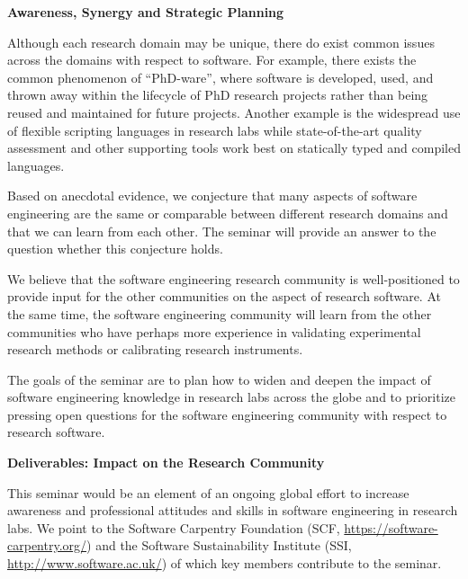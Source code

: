 \documentclass[a4paper,UKenglish]{dagman}
\renewcommand{\paragraph}[1]{{\bf #1}\xspace}
\begin{document}
\paragraph{Awareness, Synergy and Strategic Planning}

Although each research domain may be unique, there do exist common issues across the domains with respect to software. For example, there exists the common phenomenon of ``PhD-ware'', where software is developed, used, and thrown away within the lifecycle of PhD research projects rather than being reused and maintained for future projects. Another example is the widespread use of flexible scripting languages in research labs while state-of-the-art quality assessment and other supporting tools work best on statically typed and compiled languages.

Based on anecdotal evidence, we conjecture that many aspects of software engineering are the same or comparable between different research domains and that we can learn from each other. The seminar will provide an answer to the question whether this conjecture holds.

We believe that the software engineering research community is well-positioned to provide input for the other communities on the aspect of research software. At the same time, the software engineering community will learn from the other communities who have perhaps more experience in validating experimental research methods or calibrating research instruments. 

The goals of the seminar are to plan how to widen and deepen the impact of software engineering knowledge in research labs across the globe and to prioritize pressing open questions for the software engineering community with respect to research software.

\paragraph{Deliverables: Impact on the Research Community}

This seminar would be an element of an ongoing global effort to increase awareness and professional attitudes and skills in software engineering in research labs. We point to the Software Carpentry Foundation (SCF, \url{https://software-carpentry.org/}) and the Software Sustainability Institute (SSI, \url{http://www.software.ac.uk/}) of which key members contribute to the seminar.
\end{document}
